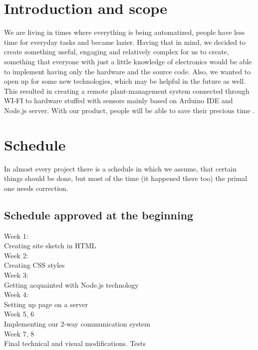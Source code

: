 \documentclass[oneside,a4paper,11pt]{report}
\begin{document}







\chapter{Introduction and scope}

We are living in times where everything is being automatized, people have less time for everyday tasks and became lazier. Having that in mind, we decided to create something useful, engaging and relatively complex for us to create, something that everyone with just a little knowledge of electronics would be able to implement having only the hardware and the source code. Also, we wanted to open up for some new technologies, which may be helpful in the future as well. This resulted in creating a remote plant-management system connected through WI-FI to hardware stuffed with sensors mainly based on Arduino IDE and Node.js server. With our product, people will be able to save their precious time \cite{sabine1922collected}.
\chapter{Schedule}
In almost every project there is a schedule in which we assume, that certain things should be done, but most of the time (it happened there too) the primal one needs correction.
\section{Schedule approved at the beginning}
Week 1:\\
Creating site sketch in HTML\\
Week 2:\\
Creating CSS styles\\
Week 3:\\
Getting acquainted with Node.js technology\\
Week 4:\\
Setting up page on a server\\
Week 5, 6\\
Implementing our 2-way communication system\\
Week 7, 8\\
Final technical and visual modifications. Tests\\
\end{document}
